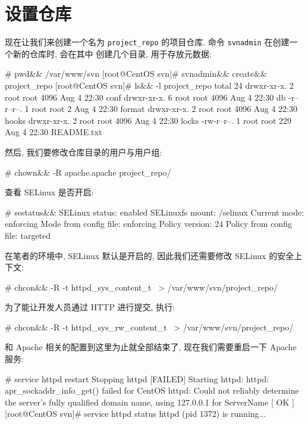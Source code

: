 \documentclass[nofonts, oneside]{ctexbook}
\newcommand\shellcmd[1]{\texttt{#1}}
\begin{document}
\section{设置仓库}
\label{sec:repository_setup}
现在让我们来创建一个名为 \texttt{project\_repo} 的项目仓库. 命令
\shellcmd{svnadmin} 在创建一个新的仓库时, 会在其中
创建几个目录, 用于存放元数据:
\begin{svnshell}
# pwd&&
/var/www/svn
[root@CentOS svn]# svnadmin&& create&& project_repo
[root@CentOS svn]# ls&& -l project_repo
total 24
drwxr-xr-x. 2 root root 4096 Aug  4 22:30 conf
drwxr-xr-x. 6 root root 4096 Aug  4 22:30 db
-r--r--r--. 1 root root    2 Aug  4 22:30 format
drwxr-xr-x. 2 root root 4096 Aug  4 22:30 hooks
drwxr-xr-x. 2 root root 4096 Aug  4 22:30 locks
-rw-r--r--. 1 root root  229 Aug  4 22:30 README.txt
\end{svnshell}
然后, 我们要修改仓库目录的用户与用户组:
\begin{svnshell}
# chown&& -R apache.apache project_repo/
\end{svnshell}
查看 SELinux 是否开启:
\begin{svnshell}
# sestatus&&
SELinux status:             enabled
SELinuxfs mount:            /selinux
Current mode:               enforcing
Mode from config file:      enforcing
Policy version:             24
Policy from config file:    targeted
\end{svnshell}
在笔者的环境中, SELinux 默认是开启的, 因此我们还需要修改 SELinux 的安全上下文:
\begin{svnshell}
# chcon&& -R -t httpd_sys_content_t \
> /var/www/svn/project_repo/
\end{svnshell}
为了能让开发人员通过 HTTP 进行提交, 执行:
\begin{svnshell}
# chcon&& -R -t httpd_sys_rw_content_t \
> /var/www/svn/project_repo/
\end{svnshell}
和 Apache 相关的配置到这里为止就全部结束了, 现在我们需要重启一下 Apache 服务:
\begin{svnshell}
[root@CentOS svn]# service httpd restart
Stopping httpd                          [FAILED]
Starting httpd: httpd: apr_sockaddr_info_get() failed for CentOS
httpd: Could not reliably determine the server's fully qualified domain
name, using 127.0.0.1 for ServerName
                                        [  OK  ]
[root@CentOS svn]# service httpd status
httpd (pid 1372) is running...
\end{svnshell}
\end{document}
